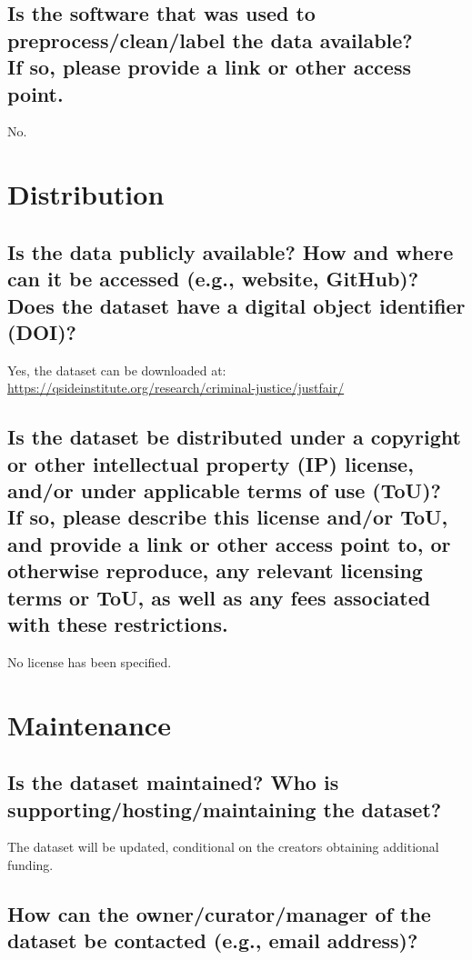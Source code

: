 \documentclass[letterpaper, 10 pt, conference]{ieeeconf}  %
\newcommand{\subtitle}[1]{{\\ \small \normalfont \color{purple} #1}}
\begin{document}
\subsection{Is the software that was used to preprocess/clean/label the data available? \subtitle{If so, please provide a link or other access point.}}

No.

\section{Distribution}

\subsection{Is the data publicly available? How and where can it be accessed (e.g., website, GitHub)? \subtitle{Does the dataset have a digital object identifier (DOI)?}}

Yes, the dataset can be downloaded at: \\ \href{https://qsideinstitute.org/research/criminal-justice/justfair/}{https://qsideinstitute.org/research/criminal-justice/justfair/}

\subsection{Is the dataset be distributed under a copyright or other intellectual property (IP) license, and/or under applicable terms of use (ToU)? \subtitle{If so, please describe this license and/or ToU, and provide a link or other access point to, or otherwise reproduce, any relevant licensing terms or ToU, as well as any fees associated with these restrictions.}}

No license has been specified.

\section{Maintenance}

\subsection{Is the dataset maintained? Who is supporting/hosting/maintaining the dataset?}

The dataset will be updated, conditional on the creators obtaining additional funding.

\subsection{How can the owner/curator/manager of the dataset be contacted (e.g., email address)?}
\end{document}
